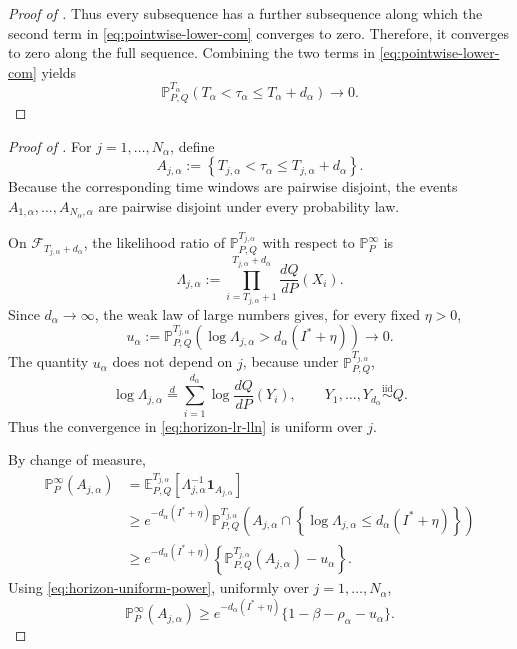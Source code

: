 \documentclass[12pt]{article}
\theoremstyle{spaced}
\theoremstyle{remark}
\begin{document}
\begin{proof}[Proof of ]
Thus every subsequence has a further subsequence along which the
second term in \eqref{eq:pointwise-lower-com} converges to zero.
Therefore, it converges to zero along the full sequence. Combining
the two terms in \eqref{eq:pointwise-lower-com} yields
\[
    \mathbb P_{P,Q}^{T_\alpha}
    \left(
        T_\alpha<\tau_\alpha
        \le T_\alpha+d_\alpha
    \right)
    \longrightarrow0.
\]
\end{proof}


\begin{proof}[Proof of ]
For \(j=1,\ldots,N_\alpha\), define
\[
    A_{j,\alpha}
    :=
    \left\{
        T_{j,\alpha}<\tau_\alpha
        \le T_{j,\alpha}+d_\alpha
    \right\}.
\]
Because the corresponding time windows are pairwise disjoint, the
events \(A_{1,\alpha},\ldots,A_{N_\alpha,\alpha}\) are pairwise
disjoint under every probability law.

On \(\mathcal F_{T_{j,\alpha}+d_\alpha}\), the likelihood ratio of
\(\mathbb P_{P,Q}^{T_{j,\alpha}}\) with respect to
\(\mathbb P_P^\infty\) is
\[
    \Lambda_{j,\alpha}
    :=
    \prod_{i=T_{j,\alpha}+1}^{T_{j,\alpha}+d_\alpha}
    \frac{dQ}{dP}(X_i).
\]
Since \(d_\alpha\to\infty\), the weak law of large numbers gives, for
every fixed \(\eta>0\),
\begin{equation}
\label{eq:horizon-lr-lln}
    u_\alpha
    :=
    \mathbb P_{P,Q}^{T_{j,\alpha}}
    \left(
        \log\Lambda_{j,\alpha}
        >
        d_\alpha(I^*+\eta)
    \right)
    \longrightarrow0.
\end{equation}
The quantity \(u_\alpha\) does not depend on \(j\), because under
\(\mathbb P_{P,Q}^{T_{j,\alpha}}\),
\[
    \log\Lambda_{j,\alpha}
    \stackrel{d}{=}
    \sum_{i=1}^{d_\alpha}
    \log\frac{dQ}{dP}(Y_i),
    \qquad
    Y_1,\ldots,Y_{d_\alpha}
    \stackrel{\mathrm{iid}}{\sim}Q.
\]
Thus the convergence in \eqref{eq:horizon-lr-lln} is uniform over
\(j\).

By change of measure,
\begin{align*}
    \mathbb P_P^\infty(A_{j,\alpha})
    &=
    \mathbb E_{P,Q}^{T_{j,\alpha}}
    \left[
        \Lambda_{j,\alpha}^{-1}
        \mathbf 1_{A_{j,\alpha}}
    \right]\\
    &\ge
    e^{-d_\alpha(I^*+\eta)}
    \mathbb P_{P,Q}^{T_{j,\alpha}}
    \left(
        A_{j,\alpha}
        \cap
        \left\{
            \log\Lambda_{j,\alpha}
            \le d_\alpha(I^*+\eta)
        \right\}
    \right)\\
    &\ge
    e^{-d_\alpha(I^*+\eta)}
    \left\{
        \mathbb P_{P,Q}^{T_{j,\alpha}}(A_{j,\alpha})
        -u_\alpha
    \right\}.
\end{align*}
Using \eqref{eq:horizon-uniform-power}, uniformly over
\(j=1,\ldots,N_\alpha\),
\[
    \mathbb P_P^\infty(A_{j,\alpha})
    \ge
    e^{-d_\alpha(I^*+\eta)}
    \{1-\beta-\rho_\alpha-u_\alpha\}.
\]


\end{proof}
\end{document}
